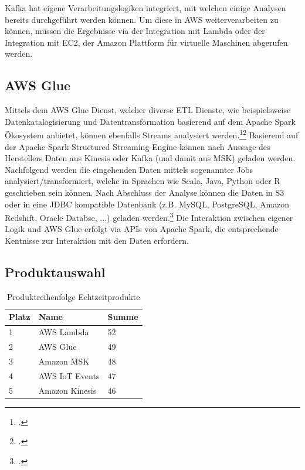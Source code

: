 Kafka hat eigene Verarbeitungslogiken integriert, mit welchen einige Analysen bereits durchgeführt werden können. Um diese in \ac{AWS} weiterverarbeiten zu können, müssen die Ergebnisse via der Integration mit Lambda oder der Integration mit \ac{EC2}, der Amazon Plattform für virtuelle Maschinen abgerufen werden.



\subsection{AWS Glue}
Mittels dem \ac{AWS} Glue Dienst, welcher diverse \ac{ETL} Dienste, wie beispielsweise Datenkatalogisierung und Datentransformation basierend auf dem Apache Spark Ökosystem anbietet, können ebenfalls Streams analysiert werden.\footcite[Vgl.][]{AmazonWebServicesInc..o.J.d}\nzitat\footcite[Vgl. auch im Folgenden][]{AmazonWebServicesInc..2020} Basierend auf der Apache Spark Structured 
Streaming-Engine können nach Aussage des Herstellers Daten aus Kinesis oder Kafka (und damit aus \ac{MSK}) geladen werden. Nachfolgend werden die eingehenden Daten mittels sogenannter Jobs analysiert/transformiert, welche in Sprachen wie Scala, Java, Python oder R geschrieben sein können. Nach Abschluss der Analyse können die Daten in \ac{S3} oder in eine \ac{JDBC} kompatible Datenbank (z.B. MySQL, PostgreSQL, Amazon Redshift, Oracle Databse, ...) geladen werden.\footcite[Vgl.][]{AmazonWebServicesInc..o.J.e} Die Interaktion zwischen eigener Logik und AWS Glue erfolgt via \acp{API} von Apache Spark, die entsprechende Kentnisse zur Interaktion mit den Daten erfordern.


\subsection{Produktauswahl}

\begin{table}[H]
\centering
\begin{tabular}{|l|l|l|}
\hline
Platz & Name & Summe \\ \hline
1 & AWS Lambda & \cellcolor[HTML]{DAE8FC}52 \\ \hline
2 & AWS Glue & \cellcolor[HTML]{DAE8FC}49 \\ \hline
3 & Amazon MSK & \cellcolor[HTML]{DAE8FC}48 \\ \hline
4 & AWS IoT Events & \cellcolor[HTML]{DAE8FC}47 \\ \hline
5 & Amazon Kinesis & \cellcolor[HTML]{DAE8FC}46 \\ \hline
\end{tabular}
\caption{Produktreihenfolge Echtzeitprodukte}
\label{tab:Reihenfolge-Echtzeit}
\end{table}
